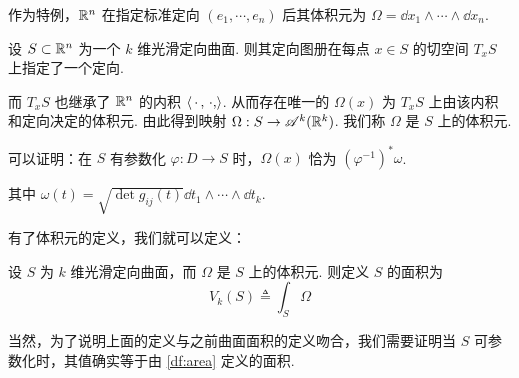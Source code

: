 作为特例，$\mathbb{R}^n$ 在指定标准定向 $(e_1,\cdots,e_n)$ 后其体积元为 $\Omega=\dd x_1\wedge\cdots\wedge\dd x_n$.


\begin{definition}
    设 $S\subset\mathbb{R}^n$ 为一个 $k$ 维光滑定向曲面. 则其定向图册在每点 $x\in S$ 的切空间 $T_xS$ 上指定了一个定向.

    而 $T_xS$ 也继承了 $\mathbb{R}^n$ 的内积 $\left\langle{\,\cdot\,,\,\cdot,}\right\rangle$. 从而存在唯一的 $\Omega(x)$ 为 $T_xS$ 上由该内积和定向决定的体积元. 由此得到映射 $\Omega:S\to\mathscr{A}^k(\mathbb{R}^k)$. 我们称 $\Omega$ 是 $S$ 上的体积元.
\end{definition}

\begin{hint}
    可以证明：在 $S$ 有参数化 $\varphi:D\to S$ 时，$\Omega(x)$ 恰为 $(\varphi^{-1})^*\omega$.
    
    其中 $\omega(t)=\sqrt{\det g_{ij}(t)}\dd t_1\wedge\cdots\wedge\dd t_k$.
\end{hint}

有了体积元的定义，我们就可以定义：

\begin{definition}
    设 $S$ 为 $k$ 维光滑定向曲面，而 $\Omega$ 是 $S$ 上的体积元. 则定义 $S$ 的面积为
$$
V_k(S)\triangleq\int_S\Omega
$$
\end{definition}

当然，为了说明上面的定义与之前曲面面积的定义吻合，我们需要证明当 $S$ 可参数化时，其值确实等于由 \ref{df:area} 定义的面积.

